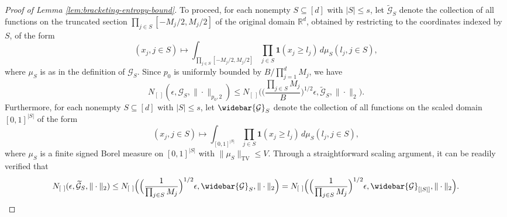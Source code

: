 \documentclass[10pt]{article}
\newcommand{\G}{{\mathcal{G}}}
\newcommand{\R}{{\mathbb R}}
\newcommand{\ind}{{\mathbf{1}}}
\begin{document}
\begin{proof}[Proof of Lemma \ref{lem:bracketing-entropy-bound}]
To proceed, for each nonempty $S \subseteq [d]$ with $|S| \le s$, let 
$\widetilde{\G}_S$ denote the collection of all functions on the 
truncated section $\prod_{j \in S} [-M_j/2, M_j/2]$ of the original 
domain $\R^d$, obtained by restricting to the coordinates indexed by 
$S$, of the form
\begin{equation*}
    (x_j, j \in S) \mapsto 
    \int_{\prod_{j \in S} [-M_j/2, M_j/2]} \prod_{j \in S} 
    \ind(x_j \ge l_j) \, d\mu_S(l_j, j \in S),
\end{equation*}
where $\mu_S$ is as in the definition of $\G_{S}$.
Since $p_0$ is uniformly bounded by $B/\prod_{j = 1}^{d} M_j$, we have
\begin{equation}\label{eq:sectional-domain}
    N_{[ \ ]}(\epsilon, \G_{S}, \| \cdot \|_{p_0, 2})
    \le N_{[ \ ]}\Big(\Big(\frac{\prod_{j \in S} M_j}{B}\Big)^{1/2} 
    \epsilon, \widetilde{\G}_S, \| \cdot \|_2\Big).
\end{equation}
Furthermore, for each nonempty $S \subseteq [d]$ with $|S| \le s$, let 
$\widebar{\G}_S$ denote the collection of all functions on the scaled domain 
$[0, 1]^{|S|}$ of the form
\begin{equation*}
    (x_j, j \in S) \mapsto 
    \int_{[0, 1]^{|S|}} \prod_{j \in S} 
    \ind(x_j \ge l_j) \, d\mu_S(l_j, j \in S),
\end{equation*}
where $\mu_S$ is a finite signed Borel measure on $[0, 1]^{|S|}$ with 
$\|\mu_S\|_{\text{TV}} \le V$. Through a straightforward scaling 
argument, it can be readily verified that
\begin{equation}\label{eq:integral-scaling}
    N_{[ \ ]}(\epsilon, \widetilde{\G}_S, \| \cdot \|_2) 
    \le N_{[ \ ]}\Big(
    \Big(\frac{1}{\prod_{j \in S} M_j}\Big)^{1/2} \epsilon, 
    \widebar{\G}_S, \| \cdot \|_2\Big) 
    = N_{[ \ ]}\Big(
    \Big(\frac{1}{\prod_{j \in S} M_j}\Big)^{1/2} \epsilon, 
    \widebar{\G}_{[|S|]}, \| \cdot \|_2\Big).
\end{equation}


\end{proof}
\end{document}
